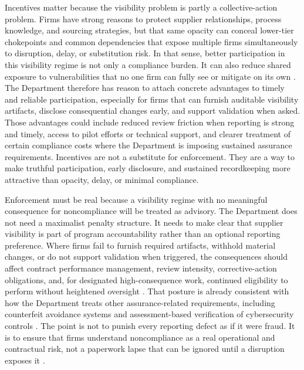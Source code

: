 Incentives matter because the visibility problem is partly a collective-action problem. Firms have strong reasons to protect supplier relationships, process knowledge, and sourcing strategies, but that same opacity can conceal lower-tier chokepoints and common dependencies that expose multiple firms simultaneously to disruption, delay, or substitution risk. In that sense, better participation in this visibility regime is not only a compliance burden. It can also reduce shared exposure to vulnerabilities that no one firm can fully see or mitigate on its own \parencite{ch5_dod2022_supplychains,U.S.GovernmentAccountabilityOffice2025,ch5_dbb2025_illumination}. The Department therefore has reason to attach concrete advantages to timely and reliable participation, especially for firms that can furnish auditable visibility artifacts, disclose consequential changes early, and support validation when asked. Those advantages could include reduced review friction when reporting is strong and timely, access to pilot efforts or technical support, and clearer treatment of certain compliance costs where the Department is imposing sustained assurance requirements. Incentives are not a substitute for enforcement. They are a way to make truthful participation, early disclosure, and sustained recordkeeping more attractive than opacity, delay, or minimal compliance.

Enforcement must be real because a visibility regime with no meaningful consequence for noncompliance will be treated as advisory. The Department does not need a maximalist penalty structure. It needs to make clear that supplier visibility is part of program accountability rather than an optional reporting preference. Where firms fail to furnish required artifacts, withhold material changes, or do not support validation when triggered, the consequences should affect contract performance management, review intensity, corrective-action obligations, and, for designated high-consequence work, continued eligibility to perform without heightened oversight \parencite{ch5_dfars2522467007,ch5_dfars2522047020}. That posture is already consistent with how the Department treats other assurance-related requirements, including counterfeit avoidance systems and assessment-based verification of cybersecurity controls \parencite{ch5_dfars2522467007,ch5_dfars2522047020}. The point is not to punish every reporting defect as if it were fraud. It is to ensure that firms understand noncompliance as a real operational and contractual risk, not a paperwork lapse that can be ignored until a disruption exposes it \parencite{ch5_nist800161r1upd1}.

